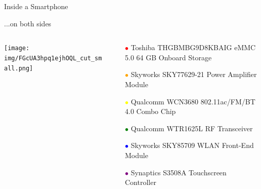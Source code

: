 \documentclass[aspectratio=169]{beamer}
\begin{document}
	\begin{frame}{Inside a Smartphone}
		\begin{flushleft}...on both sides\end{flushleft}
		\begin{columns}
		\begin{column}{0.55\textwidth}	
		\centering
		\texttt{[image: img/FGcUA3hpq1ejhOQL\_cut\_small.png]}	
		\end{column}
		\begin{column}{0.45\textwidth}
		\centering		
		\begin{footnotesize}
		\begin{itemize}
		\item[\textcolor{red}{$\bullet$}] Toshiba THGBMBG9D8KBAIG eMMC 5.0 64 GB Onboard Storage
		\item[\textcolor{orange}{$\bullet$}] Skyworks SKY77629-21 Power Amplifier Module
		\item[\textcolor{yellow}{$\bullet$}] Qualcomm WCN3680 802.11ac/FM/BT 4.0 Combo Chip
		\item[\textcolor{green}{$\bullet$}] Qualcomm WTR1625L RF Transceiver
		\item[\textcolor{blue}{$\bullet$}] Skyworks SKY85709 WLAN Front-End Module
		\item[\textcolor{purple}{$\bullet$}] Synaptics S3508A Touchscreen Controller
		\end{itemize}
		\end{footnotesize}
		\end{column}
		\end{columns}
	\end{frame}  
\end{document}

